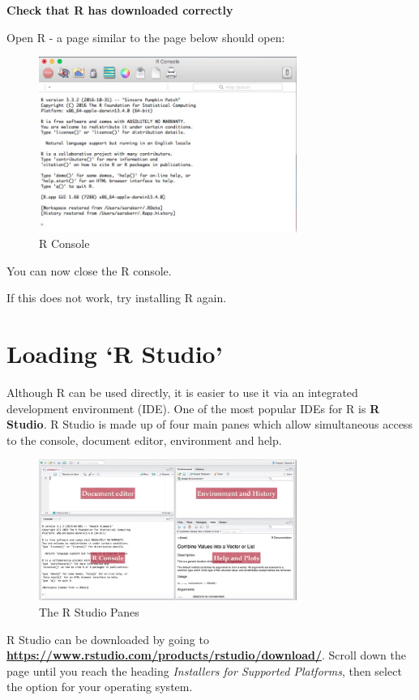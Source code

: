 \documentclass[12pt]{article}
\begin{document}
\textbf{Check that R has downloaded correctly}

Open R - a page similar to the page below should open:

\begin{figure}[H]
	\centering
	\includegraphics[width=0.75\textwidth]{rconsole.jpg}
	\caption{R Console}
\end{figure}

You can now close the R console.

If this does not work, try installing R again.

\section{Loading `R Studio'}
Although R can be used directly, it is easier to use it via an integrated development environment (IDE). One of the most popular IDEs for R is \textbf{R Studio}. R Studio is made up of four main panes which allow simultaneous access to the console, document editor, environment and help.
\begin{figure}[H]
	\centering
	\includegraphics[width=0.75\textwidth]{rstudiopanes.jpg}
	\caption{The R Studio Panes}
\end{figure}

R Studio can be downloaded by going to \textbf{\url{https://www.rstudio.com/products/rstudio/download/}}. Scroll down the page until you reach the heading \textit{Installers for Supported Platforms}, then select the option for your operating system. 
\end{document}
